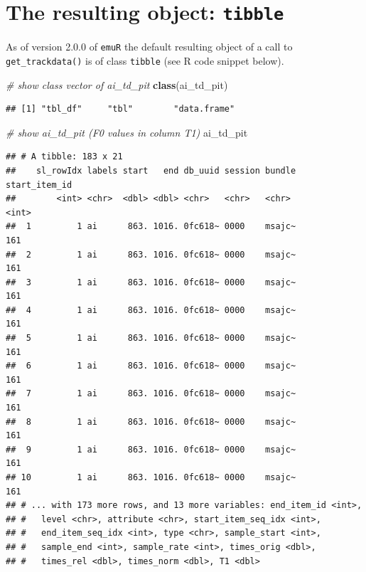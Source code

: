 \documentclass[]{book}
\newenvironment{Shaded}{\begin{snugshade}}{\end{snugshade}}
\newcommand{\CommentTok}[1]{\textcolor[rgb]{0.56,0.35,0.01}{\textit{#1}}}
\newcommand{\KeywordTok}[1]{\textcolor[rgb]{0.13,0.29,0.53}{\textbf{#1}}}
\newcommand{\NormalTok}[1]{#1}
\begin{document}
\hypertarget{the-resulting-object-tibble}{%
\section{\texorpdfstring{The resulting object: \texttt{tibble}}{The resulting object: tibble}}\label{the-resulting-object-tibble}}

As of version 2.0.0 of \texttt{emuR} the default resulting object of a call to \texttt{get\_trackdata()} is of class \texttt{tibble} (see R code snippet below).

\begin{Shaded}
\begin{Highlighting}[]
\CommentTok{# show class vector of ai_td_pit}
\KeywordTok{class}\NormalTok{(ai_td_pit)}
\end{Highlighting}
\end{Shaded}

\begin{verbatim}
## [1] "tbl_df"     "tbl"        "data.frame"
\end{verbatim}

\begin{Shaded}
\begin{Highlighting}[]
\CommentTok{# show ai_td_pit (F0 values in column T1)}
\NormalTok{ai_td_pit}
\end{Highlighting}
\end{Shaded}

\begin{verbatim}
## # A tibble: 183 x 21
##    sl_rowIdx labels start   end db_uuid session bundle start_item_id
##        <int> <chr>  <dbl> <dbl> <chr>   <chr>   <chr>          <int>
##  1         1 ai      863. 1016. 0fc618~ 0000    msajc~           161
##  2         1 ai      863. 1016. 0fc618~ 0000    msajc~           161
##  3         1 ai      863. 1016. 0fc618~ 0000    msajc~           161
##  4         1 ai      863. 1016. 0fc618~ 0000    msajc~           161
##  5         1 ai      863. 1016. 0fc618~ 0000    msajc~           161
##  6         1 ai      863. 1016. 0fc618~ 0000    msajc~           161
##  7         1 ai      863. 1016. 0fc618~ 0000    msajc~           161
##  8         1 ai      863. 1016. 0fc618~ 0000    msajc~           161
##  9         1 ai      863. 1016. 0fc618~ 0000    msajc~           161
## 10         1 ai      863. 1016. 0fc618~ 0000    msajc~           161
## # ... with 173 more rows, and 13 more variables: end_item_id <int>,
## #   level <chr>, attribute <chr>, start_item_seq_idx <int>,
## #   end_item_seq_idx <int>, type <chr>, sample_start <int>,
## #   sample_end <int>, sample_rate <int>, times_orig <dbl>,
## #   times_rel <dbl>, times_norm <dbl>, T1 <dbl>
\end{verbatim}
\end{document}
